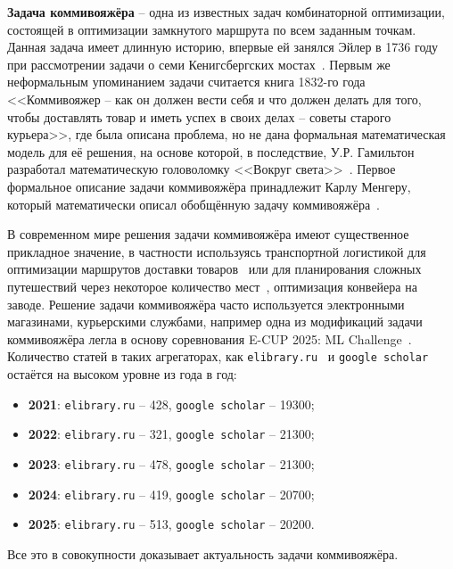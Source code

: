
\textbf{Задача коммивояжёра} -- одна из известных задач комбинаторной оптимизации, состоящей в оптимизации замкнутого маршрута по всем заданным точкам. Данная задача имеет длинную историю, впервые ей занялся Эйлер в 1736 году при рассмотрении задачи о семи Кенигсбергских мостах~\cite[с.~641]{eiler}. Первым же неформальным упоминанием задачи считается книга 1832-го года <<Коммивояжер -- как он должен вести себя и что должен делать для того, чтобы доставлять товар и иметь успех в своих делах -- советы старого курьера>>, где была описана проблема, но не дана формальная математическая модель для её решения, на основе которой, в последствие, У.Р. Гамильтон разработал математическую головоломку <<Вокруг света>>~\cite{razvitie}. Первое формальное описание задачи коммивояжёра принадлежит Карлу Менгеру, который математически описал обобщённую задачу коммивояжёра~\cite{history}.

В современном  мире решения задачи коммивояжёра имеют существенное прикладное значение, в частности используясь транспортной логистикой для оптимизации маршрутов доставки товаров~\cite{logistic} или для планирования сложных путешествий через некоторое количество мест~\cite{putesh}, оптимизация конвейера на заводе. Решение задачи коммивояжёра часто используется электронными магазинами, курьерскими службами, например одна из модификаций задачи коммивояжёра легла в основу соревнования E-CUP 2025: ML Challenge~\cite{e-cup}. Количество статей в таких агрегаторах, как \texttt{elibrary.ru}~\cite{elib} и \texttt{google scholar}~\cite{scholar} остаётся на высоком уровне из года в год:
\begin{itemize}
	\item \textbf{2021}: \texttt{elibrary.ru} -- 428, \texttt{google scholar} -- 19300;
	\item \textbf{2022}: \texttt{elibrary.ru} -- 321, \texttt{google scholar} -- 21300;
	\item \textbf{2023}: \texttt{elibrary.ru} -- 478, \texttt{google scholar} -- 21300;
	\item \textbf{2024}: \texttt{elibrary.ru} -- 419, \texttt{google scholar} -- 20700;
	\item \textbf{2025}: \texttt{elibrary.ru} -- 513, \texttt{google scholar} -- 20200.
\end{itemize}
Все это в совокупности доказывает актуальность задачи коммивояжёра.

